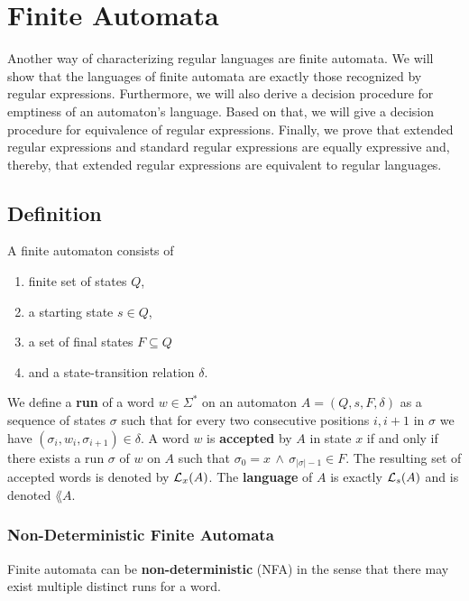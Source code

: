 \chapter{Finite Automata}
\label{chap:FA}

Another way of characterizing regular languages are finite automata. 
We will show that the languages of finite automata are exactly those recognized by regular expressions.
Furthermore, we will also derive a decision procedure for emptiness of an automaton's language.
Based on that, we will give a decision procedure for equivalence of regular expressions.
Finally, we prove that extended regular expressions and standard regular expressions are equally expressive 
and, thereby, that extended regular expressions are equivalent to regular languages.

\section{Definition}
A finite automaton \cite{DBLP:books/daglib/0011126} consists of
\begin{enumerate}
    \item
        finite set of states $Q$, 
    \item 
        a starting state $s \in Q$, 
    \item 
        a set of final states $F \subseteq Q$ 
    \item 
        and a state-transition relation $\delta$. 
\end{enumerate}

We define a \textbf{run} of a word $w \in \Sigma^*$ on an automaton $A = (Q, s, F, \delta)$ as a sequence of states $\sigma$ such that 
for every two consecutive positions $i,i+1$ in $\sigma$ we have 
$(\sigma_i, w_i, \sigma_{i+1}) \in \delta$.
A word $w$ is \textbf{accepted} by $A$ in state $x$ if and only if there exists a run $\sigma$ of $w$ on $A$ such that $\sigma_0 = x \, \wedge \, \sigma_{\vert\sigma\vert-1} \in F$.
The resulting set of accepted words is denoted by $\mathcal{L}_{x}(A)$.
The \textbf{language} of $A$ is exactly $\mathcal{L}_{s}(A)$ and is denoted $\lang{A}$. 

\subsection{Non-Deterministic Finite Automata}
Finite automata can be \textbf{non-deterministic} (NFA) in the sense that there may exist multiple distinct runs for a word. 



